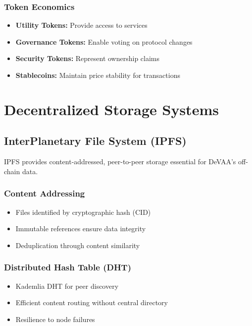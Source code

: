 \subsubsection{Token Economics}
\begin{itemize}
    \item \textbf{Utility Tokens:} Provide access to services
    \item \textbf{Governance Tokens:} Enable voting on protocol changes
    \item \textbf{Security Tokens:} Represent ownership claims
    \item \textbf{Stablecoins:} Maintain price stability for transactions
\end{itemize}

\section{Decentralized Storage Systems}

\subsection{InterPlanetary File System (IPFS)}

IPFS provides content-addressed, peer-to-peer storage essential for DeVAA's off-chain data.

\subsubsection{Content Addressing}
\begin{itemize}
    \item Files identified by cryptographic hash (CID)
    \item Immutable references ensure data integrity
    \item Deduplication through content similarity
\end{itemize}

\subsubsection{Distributed Hash Table (DHT)}
\begin{itemize}
    \item Kademlia DHT for peer discovery
    \item Efficient content routing without central directory
    \item Resilience to node failures
\end{itemize}

